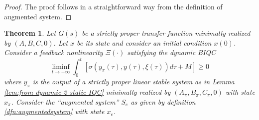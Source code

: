 \documentclass[letterpaper,10pt,conference,twocolumn]{IEEEtran}
\newtheorem{thm}{Theorem}[section]
\newcommand{\csi}{\xi}
\newcommand{\Csi}{\Xi}
\begin{document}
\begin{proof}
	The proof follows in a straightforward way from the definition of augmented system.
\end{proof}
\begin{thm}\label{thm:EPI set for lur'e systems}
	Let $G(s)$ be a strictly proper transfer function minimally realized by $(A,B,C,0)$. Let $x$ be its state and consider an initial condition $x(0)$. Consider a feedback nonlinearity $\Csi(\cdot)$ satisfying the dynamic BIQC
	\begin{equation*}
		\liminf_{t\rightarrow +\infty}\int_{0}^{t}
			[\sigma(y_{\pi}(\tau),y(\tau),\csi(\tau))d\tau + M] \geq 0
	\end{equation*}
	where $y_{\pi}$ is the output of a strictly proper linear stable system as in Lemma \ref{lem:from dynamic 2 static IQC} minimally realized by $(A_{\pi}, B_{\pi}, C_{\pi},0)$ with state $x_{\pi}$. Consider the ``augmented system'' $S_e$ as given by definition
	\ref{dfn:augmentedsystem} with state $x_e$.

\end{thm}
\end{document}
